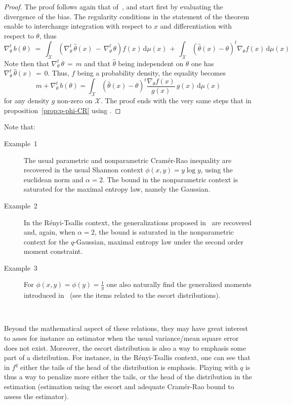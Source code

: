 \documentclass[english,sort&compress]{elsarticle}
\theoremstyle{definition}
\theoremstyle{plain}
\theoremstyle{plain}
\def\dmu{\mathrm{d}\mu}
\def\X{\mathcal{X}}
\begin{document}
\begin{proof}
  The proof  follows again that  of~\cite{Ber13}, and start first  by evaluating
  the divergence of the bias.  The regularity conditions in the statement of the
  theorem   enable  to  interchange   integration  with   respect  to   $x$  and
  differentiation with respect to $\theta$, thus
  \[
  \nabla_\theta^t  \,  b(\theta)  \:  =  \: \int_\X  \left(  \nabla_\theta^t  \,
    \widehat{\theta}(x)  \,  - \,  \nabla_\theta^t  \,  \theta  \right) f(x)  \,
  \dmu(x)  \,  +  \,  \int_\X  \left(  \widehat{\theta}(x)  -  \theta  \right)^t
  \nabla_\theta f(x) \, \dmu(x)
  \]
  Note   then  that   $\nabla_\theta^t  \,   \theta  \,   =  \,   m$   and  that
  $\widehat{\theta}$  being independent  on  $\theta$ one  has $\nabla_\theta^t  \,
  \widehat{\theta}(x) \,  = \, 0$. Thus,  $f$ being a  probability density, the
  equality becomes
  \[
  m + \nabla_\theta^t \, b(\theta) = \int_\X \left( \widehat{\theta}(x) - \theta
  \right)^t \frac{\nabla_\theta f(x)}{g(x)} \, g(x) \, \dmu(x)
  \]
  for any density $g$ non-zero on $\X$.  The proof ends with the very same steps
  that in proposition~\ref{prop:p-phi-CR} using \cite[Lemma~2]{Ber13}.
\end{proof}

%
Note that:
%
\begin{description}%
\item[Example~1] The usual parametric  and nonparametric Cram\'er-Rao inequality
  are recovered in the  usual Shannon context $\phi(x,y) = y  \log y$, using the
  euclidean norm  and $\alpha =  2$. The bound  in the nonparametric  context is
  saturated for the maximal entropy law, namely the Gaussian.
%
\item[Example~2]  In the R\'enyi-Tsallis  context, the  generalizations proposed
  in~\cite{Ber12:06_1, Ber12:06_2, Ber13} are recovered and, again, when $\alpha
  =  2$,  the   bound  is  saturated  in  the   nonparametric  context  for  the
  $q$-Gaussian, maximal entropy law under the second order moment constraint.
%
\item[Example~3] For $\phi(x,y) = \phi(y) = \frac{1}{y}$ one also naturally find
  the generalized moments introduced  in~\cite{TsaMen98,MarNic00} (see the items
  related to the escort distributions).
\end{description}

\

Beyond the mathematical aspect of  these relations, they may have great interest
to asses  for instance  an estimator when  the usual variance/mean  square error
does not exist. Moreover, the escort distribution is also a way to emphasis some
part of  a distribution. For instance,  in the R\'enyi-Tsallis  context, one can
see  that  in  $f^q$ either  the  tails  of  the  head  of the  distribution  is
emphasis. Playing with $q$  is thus a way to penalize more  either the tails, or
the head of the distribution in  the estimation (estimation using the escort and
adequate Cram\'er-Rao bound to assess the estimator).
\end{document}
